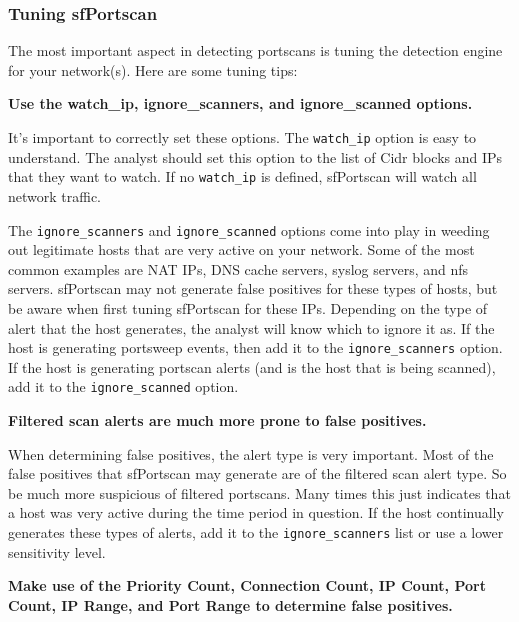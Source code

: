 \documentclass[english]{report}
\newcounter{slistnum}
\newenvironment{slist}
{ \begin{list}{ {\bf \arabic{slistnum}.} }{\usecounter{slistnum} } }
{ \end{list} }
\begin{document}
\subsubsection{Tuning sfPortscan\label{tuning sfportscan}}

The most important aspect in detecting portscans is tuning the detection engine
for your network(s).  Here are some tuning tips:

\begin{slist}

\item \textbf{Use the watch\_ip, ignore\_scanners, and ignore\_scanned options.}
  
     It's important to correctly set these options.  The \texttt{watch\_ip} option is easy
     to understand.  The analyst should set this option to the list of Cidr 
     blocks and IPs that they want to watch.  If no \texttt{watch\_ip} is defined, 
     sfPortscan will watch all network traffic.
     
     The \texttt{ignore\_scanners} and \texttt{ignore\_scanned} options come into play in weeding
     out legitimate hosts that are very active on your network.  Some of the
     most common examples are NAT IPs, DNS cache servers, syslog servers, and
     nfs servers.  sfPortscan may not generate false positives for these types
     of hosts, but be aware when first tuning sfPortscan for these IPs. 
     Depending on the type of alert that the host generates, the analyst will
     know which to ignore it as.  If the host is generating portsweep events,
     then add it to the \texttt{ignore\_scanners} option.  If the host is generating
     portscan alerts (and is the host that is being scanned), add it to the
     \texttt{ignore\_scanned} option.
  
\item \textbf{Filtered scan alerts are much more prone to false positives.}
  
     When determining false positives, the alert type is very important.  Most of
     the false positives that sfPortscan may generate are of the filtered scan
     alert type.  So be much more suspicious of filtered portscans.  Many times
     this just indicates that a host was very active during the time period in
     question.  If the host continually generates these types of alerts, add it
     to the \texttt{ignore\_scanners} list or use a lower sensitivity level.
     
\item \textbf{Make use of the Priority Count, Connection Count, IP Count, Port Count, IP Range, and Port Range to determine false positives.}
     

\end{slist}
\end{document}
